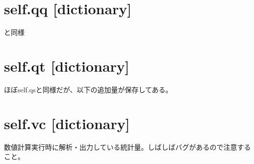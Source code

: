\documentclass[letterpaper,10pt,dvipdfmx,report]{sphinxmanual}
\begin{document}
\section{self.qq {[}dictionary{]}}
\label{\detokenize{notation:self-qq-dictionary}}
\sphinxAtStartPar
{} と同様


\section{self.qt {[}dictionary{]}}
\label{\detokenize{notation:self-qt-dictionary}}
\sphinxAtStartPar
ほぼself.qsと同様だが、以下の追加量が保存してある。


\section{self.vc {[}dictionary{]}}
\label{\detokenize{notation:self-vc-dictionary}}
\sphinxAtStartPar
数値計算実行時に解析・出力している統計量。しばしばバグがあるので注意すること。

\begin{sphinxVerbatim}[commandchars=\\\{\}]
  
\end{sphinxVerbatim}
\end{document}
